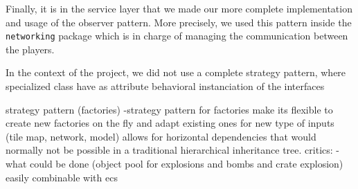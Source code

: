 Finally, it is in the service layer that we made our more complete implementation and usage of the observer pattern. More precisely, we used this pattern inside the \texttt{networking} package which is in charge of managing the communication between the players.  


In the context of the project, we did not use a complete strategy pattern, where specialized class have as attribute behavioral instanciation of the interfaces

strategy pattern (factories)
-strategy pattern for factories make its flexible to create new factories on the fly and adapt existing ones for new type of inputs (tile map, network, model) allows for horizontal dependencies that would normally not be possible in a traditional hierarchical inheritance tree.
critics:
- what could be done (object pool for explosions and bombs and crate explosion) easily combinable with ecs
